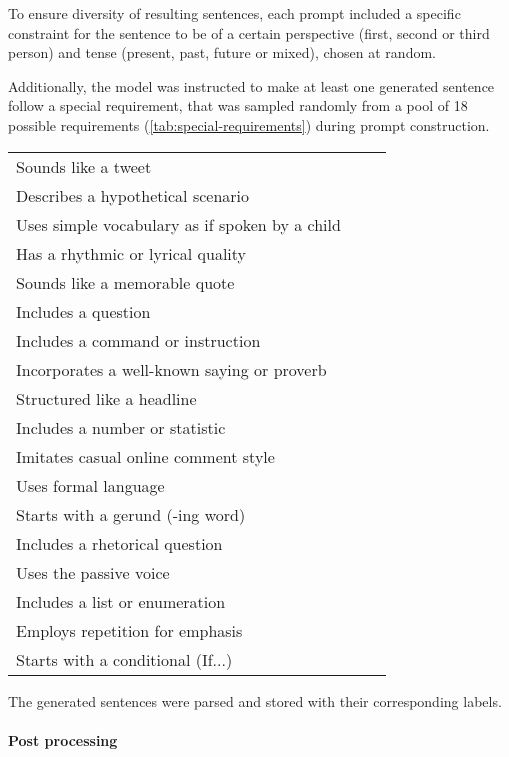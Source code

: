 To ensure diversity of resulting sentences, each prompt included a specific constraint for the sentence to be of a certain perspective (first, second or third person) and tense (present, past, future or mixed), chosen at random.

Additionally, the model was instructed to make at least one generated sentence follow a special requirement, that was sampled randomly from a pool of 18 possible requirements (\cref{tab:special-requirements}) during prompt construction. 

\begin{table*}[ht]
    \centering
    \begin{tabular}{p{0.75\linewidth}}
        Sounds like a tweet \\
        Describes a hypothetical scenario \\
        Uses simple vocabulary as if spoken by a child \\
        Has a rhythmic or lyrical quality \\
        Sounds like a memorable quote \\
        Includes a question \\
        Includes a command or instruction \\
        Incorporates a well-known saying or proverb \\
        Structured like a headline \\
        Includes a number or statistic \\
        Imitates casual online comment style \\
        Uses formal language \\
        Starts with a gerund (-ing word) \\
        Includes a rhetorical question \\
        Uses the passive voice \\
        Includes a list or enumeration \\
        Employs repetition for emphasis \\
        Starts with a conditional (If...)
    \end{tabular}
    \caption{Possible special requirements during dataset generation}
    \label{tab:special-requirements}
\end{table*}



The generated sentences were parsed and stored with their corresponding labels.


\paragraph{Post processing}

